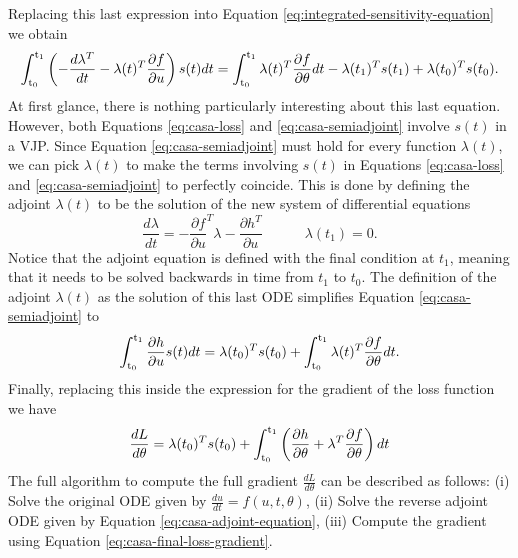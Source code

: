 Replacing this last expression into Equation \eqref{eq:integrated-sensitivity-equation} we obtain 
\begin{equation}
    \operatorname{\int_{t_0}^{t_1}} \left( - \frac{d\lambda^T}{dt} -  \lambda(t)^T \frac{\partial f}{\partial u} \right) s(t) dt
    =
    \operatorname{\int_{t_0}^{t_1}} \lambda(t)^T \frac{\partial f}{\partial \theta} dt 
    - 
    \lambda(t_1)^T s(t_1)
    + 
    \lambda(t_0)^T s(t_0).
    \label{eq:casa-semiadjoint}
\end{equation}
At first glance, there is nothing particularly interesting about this last equation. 
However, both Equations \eqref{eq:casa-loss} and \eqref{eq:casa-semiadjoint} involve $s(t)$ in a VJP. 
Since Equation \eqref{eq:casa-semiadjoint} must hold for every function $\lambda(t)$, we can pick $\lambda(t)$ to make the terms involving $s(t)$ in Equations \eqref{eq:casa-loss} and \eqref{eq:casa-semiadjoint} to perfectly coincide. 
This is done by defining the adjoint $\lambda(t)$ to be the solution of the new system of differential equations
\begin{equation}
    \frac{d\lambda}{dt} 
    = 
    - 
    \frac{\partial f}{\partial u}^T \lambda  
    - 
    \frac{\partial h^T}{\partial u} 
    \qquad \quad \lambda(t_1) = 0. 
    \label{eq:casa-adjoint-equation}
\end{equation}
Notice that the adjoint equation is defined with the final condition at $t_1$, meaning that it needs to be solved backwards in time from $t_1$ to $t_0$. 
The definition of the adjoint $\lambda(t)$ as the solution of this last ODE simplifies Equation \eqref{eq:casa-semiadjoint} to
\begin{equation}
    \operatorname{\int_{t_0}^{t_1}} \frac{\partial h}{\partial u} s(t) dt
    = 
    \lambda(t_0)^T s(t_0)
    + 
    \operatorname{\int_{t_0}^{t_1}} \lambda(t)^T \frac{\partial f}{\partial \theta} dt.
\end{equation}
Finally, replacing this inside the expression for the gradient of the loss function we have 
\begin{equation}
    \frac{dL}{d\theta}
    = 
    \lambda(t_0)^T s(t_0)
    + 
    \operatorname{\int_{t_0}^{t_1}}
    \left( \frac{\partial h}{\partial \theta} + \lambda^T \frac{\partial f}{\partial \theta} \right) dt
    \label{eq:casa-final-loss-gradient}
\end{equation}
The full algorithm to compute the full gradient $\frac{dL}{d\theta}$ can be described as follows: (i) Solve the original ODE given by $\frac{du}{dt} = f(u, t, \theta)$, (ii) Solve the reverse adjoint ODE given by Equation \eqref{eq:casa-adjoint-equation}, (iii) Compute the gradient using Equation \eqref{eq:casa-final-loss-gradient}.



